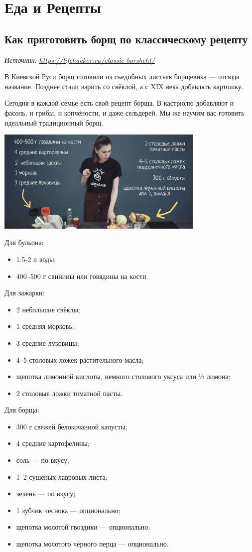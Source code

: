 \chapter{Еда и Рецепты}
\section{Как приготовить борщ по классическому рецепту}
\textit{Источник: \url{https://lifehacker.ru/classic-borshcht/}}

В Киевской Руси борщ готовили из съедобных листьев борщевика — отсюда название. Позднее стали варить со свёклой, а с XIX века добавлять картошку.


Сегодня в каждой семье есть свой рецепт борща. В кастрюлю добавляют и фасоль, и грибы, и копчёности, и даже сельдерей. Мы же научим вас готовить идеальный традиционный борщ.

\includegraphics[width=0.75\textwidth]{img/borsch-e1568359200134.jpg}

Для бульона:
\begin{itemize}
    \item 1.5-2 л воды;
    \item400–500 г свинины или говядины на кости.
\end{itemize}


Для зажарки:
\begin{itemize}
    \item 2 небольшие свёклы;
    \item 1 средняя морковь;
    \item 3 средние луковицы;
    \item 4–5 столовых ложек растительного масла;
    \item щепотка лимонной кислоты, немного столового уксуса или ½ лимона;
    \item 2 столовые ложки томатной пасты.
\end{itemize}


Для борща:
\begin{itemize}
    \item 300 г свежей белокочанной капусты;
    \item 4 средние картофелины;
    \item соль — по вкусу;
    \item 1–2 сушёных лавровых листа;
    \item зелень — по вкусу;
    \item 1 зубчик чеснока — опционально;
    \item щепотка молотой гвоздики — опционально;
    \item щепотка молотого чёрного перца — опционально.
\end{itemize}

